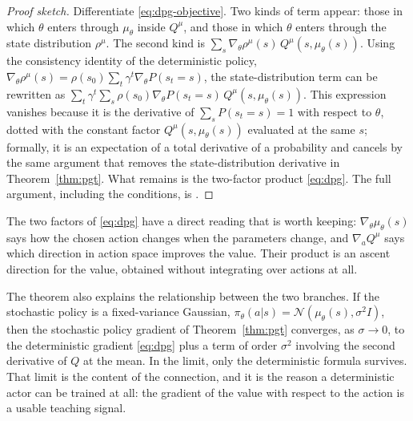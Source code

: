 \begin{proof}[Proof sketch]
Differentiate \eqref{eq:dpg-objective}. Two kinds of term appear: those in which
$\theta$ enters through $\mu_\theta$ inside $Q^\mu$, and those in which $\theta$
enters through the state distribution $\rho^\mu$. The second kind is
$\sum_s \nabla_\theta \rho^\mu(s)\, Q^\mu(s,\mu_\theta(s))$. Using the
consistency identity of the deterministic policy,
$\nabla_\theta \rho^\mu(s) = \rho(s_0)\sum_t \gamma^t \nabla_\theta P(s_t = s)$,
the state-distribution term can be rewritten as
$\sum_t \gamma^t \sum_s \rho(s_0) \nabla_\theta P(s_t = s)
\, Q^\mu(s,\mu_\theta(s))$. This expression vanishes because it is the
derivative of $\sum_s P(s_t = s) = 1$ with respect to $\theta$, dotted with the
constant factor $Q^\mu(s,\mu_\theta(s))$ evaluated at the same $s$; formally,
it is an expectation of a total derivative of a probability and cancels by the
same argument that removes the state-distribution derivative in
Theorem~\ref{thm:pgt}. What remains is the two-factor product
\eqref{eq:dpg}. The full argument, including the conditions, is
\citet{silver2014dpg}.
\end{proof}

The two factors of \eqref{eq:dpg} have a direct reading that is worth keeping:
$\nabla_\theta \mu_\theta(s)$ says how the chosen action changes when the
parameters change, and $\nabla_a Q^\mu$ says which direction in action space
improves the value. Their product is an ascent direction for the value, obtained
without integrating over actions at all.

The theorem also explains the relationship between the two branches. If the
stochastic policy is a fixed-variance Gaussian,
$\pi_\theta(a|s) = \mathcal{N}\!\left(\mu_\theta(s), \sigma^2 I\right)$, then the
stochastic policy gradient of Theorem~\ref{thm:pgt} converges, as
$\sigma \to 0$, to the deterministic gradient \eqref{eq:dpg} plus a term of order
$\sigma^2$ involving the second derivative of $Q$ at the mean. In the limit, only
the deterministic formula survives. That limit is the content of the connection,
and it is the reason a deterministic actor can be trained at all: the gradient
of the value with respect to the action is a usable teaching signal.

